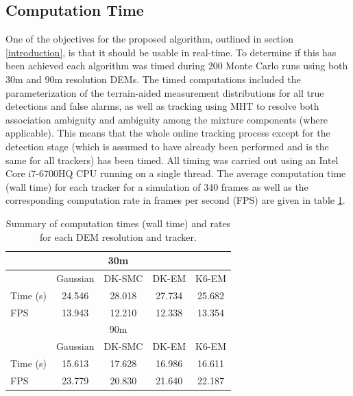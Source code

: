 \documentclass[journal]{IEEEtran}
\begin{document}
\subsection{Computation Time}
One of the objectives for the proposed algorithm, outlined in section \ref{introduction}, is that it should be usable in real-time. To determine if this has been achieved each algorithm was timed during 200 Monte Carlo runs using both 30m and 90m resolution DEMs. The timed computations included the parameterization of the terrain-aided measurement distributions for all true detections and false alarms, as well as tracking using MHT to resolve both association ambiguity and ambiguity among the mixture components (where applicable). This means that the whole online tracking process except for the detection stage (which is assumed to have already been performed and is the same for all trackers) has been timed. All timing was carried out using an Intel Core i7-6700HQ CPU running on a single thread. The average computation time (wall time) for each tracker for a simulation of 340 frames as well as the corresponding computation rate in frames per second (FPS) are given in table \ref{tab:computation_time}.

\begin{table}[ht]
\begin{center}
\small\addtolength{\tabcolsep}{-0.5pt}
\begin{tabular}{ |l|c|c|c|c| } 
 \hline
 \multicolumn{5}{|c|}{30m} \\
 \hline
  & Gaussian & DK-SMC & DK-EM & K6-EM \\
 \hline
 Time (s) & 24.546 & 28.018 & 27.734 & 25.682 \\
 FPS & 13.943 & 12.210 & 12.338 & 13.354 \\
 \hline
 
 \hline
 \multicolumn{5}{|c|}{90m} \\
 \hline
  & Gaussian & DK-SMC & DK-EM & K6-EM \\
 \hline
 Time (s) & 15.613 & 17.628 & 16.986 & 16.611 \\
 FPS & 23.779 & 20.830 & 21.640 & 22.187 \\
 \hline
\end{tabular}
\end{center}
\caption{Summary of computation times (wall time) and rates for each DEM resolution and tracker.}
\label{tab:computation_time}
\end{table}
\end{document}
